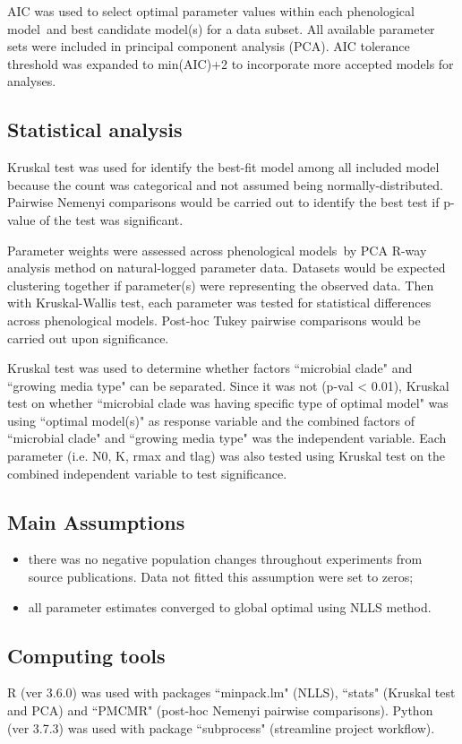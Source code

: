 \documentclass[a4paper, 11pt]{article}
\newcommand{\pml}{phenological model}
\newcommand{\pms}{phenological models}
\begin{document}
	AIC\autocite{johnson2004model,akaike1998information,burnhamdr} was used to select optimal parameter values within each \pml\ and best candidate model(s) for a data subset.  All available parameter sets were included in principal component analysis (PCA).  AIC tolerance threshold was expanded to min(AIC)+2\autocite{burnham2004multimodel} to incorporate more accepted models for analyses.
	
	\subsection*{Statistical analysis}
	Kruskal test was used for identify the best-fit model among all included model because the count was categorical and not assumed being normally-distributed.  Pairwise Nemenyi comparisons would be carried out to identify the best test if p-value of the test was significant.
	
	Parameter weights were assessed across \pms\ by PCA R-way analysis method on natural-logged parameter data.  Datasets would be expected clustering together if parameter(s) were representing the observed data.  Then with Kruskal-Wallis test, each parameter was tested for statistical differences across \pms.  Post-hoc Tukey pairwise comparisons would be carried out upon significance.
	
	Kruskal test was used to determine whether factors ``microbial clade" and ``growing media type" can be separated.  Since it was not (p-val < 0.01), Kruskal test on whether ``microbial clade was having specific type of optimal model" was using ``optimal model(s)" as response variable and the combined factors of ``microbial clade" and ``growing media type" was the independent variable.  Each parameter (i.e. N0, K, rmax and tlag) was also tested using Kruskal test on the combined independent variable to test significance.
	
	\subsection*{Main Assumptions}
	\begin{itemize}
		\item there was no negative population changes throughout experiments from source publications.  Data not fitted this assumption were set to zeros;
		\item all parameter estimates converged to global optimal using NLLS method.
	\end{itemize}
	
	\subsection*{Computing tools}
	R (ver 3.6.0)\autocite{Rcore} was used with packages ``minpack.lm"\autocite{minpacklm} (NLLS), ``stats"\autocite{Rcore} (Kruskal test and PCA) and ``PMCMR"\autocite{PMCMR} (post-hoc Nemenyi pairwise comparisons).  Python (ver 3.7.3)\autocite{py3} was used with package ``subprocess"\autocite{py3} (streamline project workflow).
	
\end{document}
